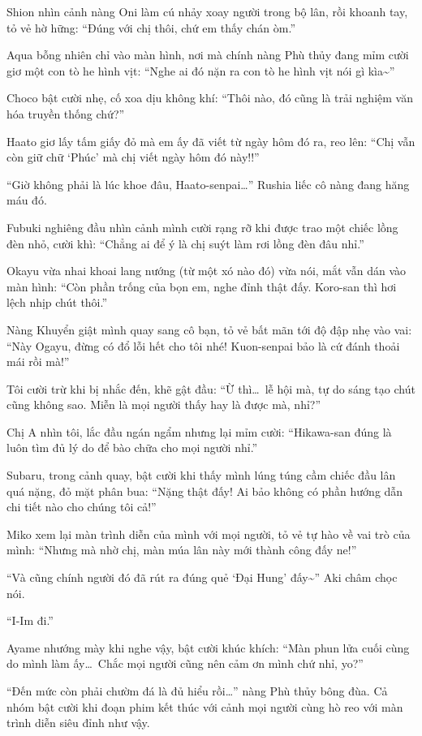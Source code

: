 \documentclass[../main.tex]{subfiles}
\begin{document}
Shion nhìn cảnh nàng Oni làm cú nhảy xoay người trong bộ lân, rồi khoanh tay, tỏ vẻ hờ hững: ``Đúng với chị thôi, chứ em thấy chán òm.''

Aqua bỗng nhiên chỉ vào màn hình, nơi mà chính nàng Phù thủy đang mỉm cười giơ một con tò he hình vịt: ``Nghe ai đó nặn ra con tò he hình vịt nói gì kìa\~{}''

Choco bật cười nhẹ, cố xoa dịu không khí: ``Thôi nào, đó cũng là trải nghiệm văn hóa truyền thống chứ?''

Haato giơ lấy tấm giấy đỏ mà em ấy đã viết từ ngày hôm đó ra, reo lên: ``Chị vẫn còn giữ chữ `Phúc' mà chị viết ngày hôm đó này!!''

``Giờ không phải là lúc khoe đâu, Haato-senpai\dots'' Rushia liếc cô nàng đang hăng máu đó.

Fubuki nghiêng đầu nhìn cảnh mình cười rạng rỡ khi được trao một chiếc lồng đèn nhỏ, cười khì: ``Chẳng ai để ý là chị suýt làm rơi lồng đèn đâu nhỉ.''

Okayu vừa nhai khoai lang nướng (từ một xó nào đó) vừa nói, mắt vẫn dán vào màn hình: ``Còn phần trống của bọn em, nghe đỉnh thật đấy. Koro-san thì hơi lệch nhịp chút thôi.''

Nàng Khuyển giật mình quay sang cô bạn, tỏ vẻ bất mãn tới độ đập nhẹ vào vai: ``Này Ogayu, đừng có đổ lỗi hết cho tôi nhé! Kuon-senpai bảo là cứ đánh thoải mái rồi mà!''

Tôi cười trừ khi bị nhắc đến, khẽ gật đầu: ``Ừ thì\dots\ lễ hội mà, tự do sáng tạo chút cũng không sao. Miễn là mọi người thấy hay là được mà, nhỉ?''

Chị A nhìn tôi, lắc đầu ngán ngẩm nhưng lại mỉm cười: ``Hikawa-san đúng là luôn tìm đủ lý do để bào chữa cho mọi người nhỉ.''

Subaru, trong cảnh quay, bật cười khi thấy mình lúng túng cầm chiếc đầu lân quá nặng, đỏ mặt phân bua: ``Nặng thật đấy! Ai bảo không có phần hướng dẫn chi tiết nào cho chúng tôi cả!''

Miko xem lại màn trình diễn của mình với mọi người, tỏ vẻ tự hào về vai trò của mình: ``Nhưng mà nhờ chị, màn múa lân này mới thành công đấy ne!''

``Và cũng chính người đó đã rút ra đúng quẻ `Đại Hung' đấy\~{}'' Aki châm chọc nói.

``I-Im đi.''

Ayame nhướng mày khi nghe vậy, bật cười khúc khích: ``Màn phun lửa cuối cùng do mình làm ấy\dots\ Chắc mọi người cũng nên cảm ơn mình chứ nhỉ, yo?''

``Đến mức còn phải chườm đá là đủ hiểu rồi\dots'' nàng Phù thủy bông đùa. Cả nhóm bật cười khi đoạn phim kết thúc với cảnh mọi người cùng hò reo với màn trình diễn siêu đỉnh như vậy.
\end{document}
